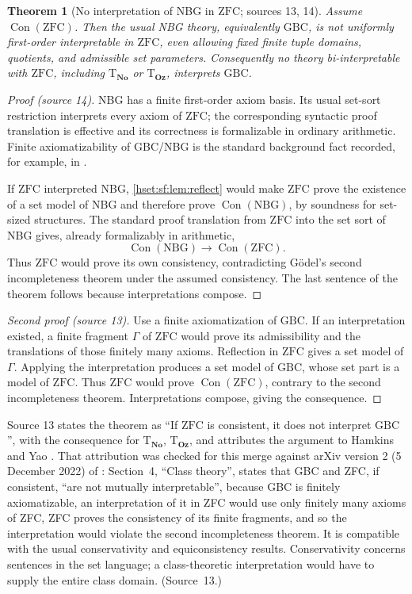 \documentclass[11pt,letterpaper]{article}
\newtheorem{theorem}{Theorem}[section]
\theoremstyle{definition}
\theoremstyle{remark}
\newcommand{\No}{\mathbf{No}}
\newcommand{\ZFC}{\mathrm{ZFC}}
\newcommand{\Oz}{\mathbf{Oz}}
\newcommand{\GBC}{\mathrm{GBC}}
\newcommand{\NBG}{\mathrm{NBG}}
\newcommand{\Con}{\operatorname{Con}}
\newcommand{\Tth}{\mathrm{T}}
\begin{document}
\begin{theorem}[No interpretation of NBG in $\ZFC$; sources 13, 14]\label{hset:sf:thm:noint}
Assume $\Con(\ZFC)$. Then the usual NBG theory, equivalently $\GBC$, is not
uniformly first-order interpretable in $\ZFC$, even allowing fixed finite tuple
domains, quotients, and admissible set parameters. Consequently no theory
bi-interpretable with $\ZFC$, including $\Tth_{\No}$ or $\Tth_{\Oz}$, interprets
$\GBC$.
\end{theorem}
\begin{proof}[Proof (source 14)]
NBG has a finite first-order axiom basis. Its usual set-sort restriction interprets
every axiom of $\ZFC$; the corresponding syntactic proof translation is effective
and its correctness is formalizable in ordinary arithmetic. Finite axiomatizability
of GBC/NBG is the standard background fact recorded, for example, in
\cite[Corollary 3.11 and its proof]{WilliamsDiss}.

If $\ZFC$ interpreted NBG, \cref{hset:sf:lem:reflect} would make $\ZFC$ prove the
existence of a set model of NBG and therefore prove $\Con(\NBG)$, by soundness for
set-sized structures. The standard proof translation from $\ZFC$ into the set sort
of NBG gives, already formalizably in arithmetic,
\[
 \Con(\NBG)\longrightarrow\Con(\ZFC).
\]
Thus $\ZFC$ would prove its own consistency, contradicting G\"odel's second
incompleteness theorem \cite{Godel} under the assumed consistency. The last
sentence of the theorem follows because interpretations compose.
\end{proof}

\begin{proof}[Second proof (source 13)]
Use a finite axiomatization of $\GBC$. If an interpretation existed, a finite
fragment $\Gamma$ of $\ZFC$ would prove its admissibility and the translations of
those finitely many axioms. Reflection in $\ZFC$ gives a set model of $\Gamma$.
Applying the interpretation produces a set model of $\GBC$, whose set part is a
model of $\ZFC$. Thus $\ZFC$ would prove $\Con(\ZFC)$, contrary to the second
incompleteness theorem. Interpretations compose, giving the consequence.
\end{proof}

Source 13 states the theorem as ``If $\ZFC$ is consistent, it does not interpret
$\GBC$'', with the consequence for $\Tth_{\No}$, $\Tth_{\Oz}$, and attributes the
argument to Hamkins and Yao \cite[Section 4]{HamkinsYao}. That attribution was
checked for this merge against arXiv version 2 (5 December 2022) of
\cite{HamkinsYao}: Section~4, ``Class theory'', states that GBC and ZFC, if
consistent, ``are not mutually interpretable'', because GBC is finitely
axiomatizable, an interpretation of it in ZFC would use only finitely many axioms
of ZFC, ZFC proves the consistency of its finite fragments, and so the
interpretation would violate the second incompleteness theorem. It is compatible
with the usual conservativity and equiconsistency results. Conservativity concerns
sentences in the set language; a class-theoretic interpretation would have to
supply the entire class domain. (Source~13.)
\end{document}
